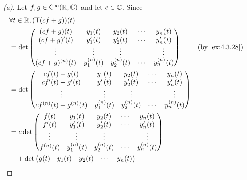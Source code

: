 \begin{proof}[(a)]
  Let \(f, g \in \cfs[\infty](\R, \C)\) and let \(c \in \mathbb{C}\).
  Since
  \begin{align*}
     & \forall t \in \R, (\T(cf + g))(t)                                                                                   \\
     & = \det\begin{pmatrix}
               (cf + g)(t)       & y_1(t)       & y_2(t)       & \cdots & y_n(t)       \\
               (cf + g)'(t)      & y_1'(t)      & y_2'(t)      & \cdots & y_n'(t)      \\
               \vdots            & \vdots       & \vdots       &        & \vdots       \\
               (cf + g)^{(n)}(t) & y_1^{(n)}(t) & y_2^{(n)}(t) & \cdots & y_n^{(n)}(t)
             \end{pmatrix}        &  & \text{(by \cref{ex:4.3.28})}                                       \\
     & = \det\begin{pmatrix}
               cf(t) + g(t)             & y_1(t)       & y_2(t)       & \cdots & y_n(t)       \\
               cf'(t) + g'(t)           & y_1'(t)      & y_2'(t)      & \cdots & y_n'(t)      \\
               \vdots                   & \vdots       & \vdots       &        & \vdots       \\
               cf^{(n)}(t) + g^{(n)}(t) & y_1^{(n)}(t) & y_2^{(n)}(t) & \cdots & y_n^{(n)}(t)
             \end{pmatrix}                                \\
     & = c \det\begin{pmatrix}
                 f(t)       & y_1(t)       & y_2(t)       & \cdots & y_n(t)       \\
                 f'(t)      & y_1'(t)      & y_2'(t)      & \cdots & y_n'(t)      \\
                 \vdots     & \vdots       & \vdots       &        & \vdots       \\
                 f^{(n)}(t) & y_1^{(n)}(t) & y_2^{(n)}(t) & \cdots & y_n^{(n)}(t)
               \end{pmatrix}                                            \\
     & \quad + \det\begin{pmatrix}
                     g(t)       & y_1(t)       & y_2(t)       & \cdots & y_n(t)       \\

\end{pmatrix}
\end{align*}
\end{proof}
